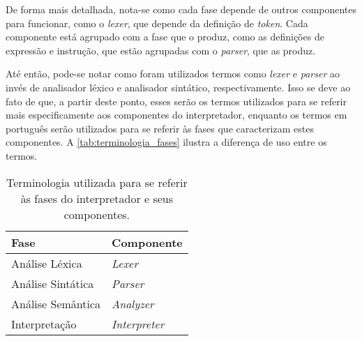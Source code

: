 De forma mais detalhada, nota-se como cada fase depende de outros componentes para funcionar, como o \textit{lexer}, que depende da definição de \textit{token}. Cada componente está agrupado com a fase que o produz, como as definições de expressão e instrução, que estão agrupadas com o \textit{parser}, que as produz.

Até então, pode-se notar como foram utilizados termos como \textit{lexer} e \textit{parser} ao invés de analisador léxico e analisador sintático, respectivamente. Isso se deve ao fato de que, a partir deste ponto, esses serão os termos utilizados para se referir mais especificamente aos componentes do interpretador, enquanto os termos em português serão utilizados para se referir às fases que caracterizam estes componentes. A \autoref{tab:terminologia_fases} ilustra a diferença de uso entre os termos.

\begin{table}[h]
	\centering
	\caption{Terminologia utilizada para se referir às fases do interpretador e seus componentes.}
	{
		\begin{tabular}{ll}
			\hline
			\textbf{Fase}          & \textbf{Componente} \\ \hline
			Análise Léxica      & \textit{Lexer}      \\
			Análise Sintática   & \textit{Parser}     \\
			Análise Semântica   & \textit{Analyzer}                   \\
			Interpretação       & \textit{Interpreter}                   \\ \hline
		\end{tabular}
	}
	\label{tab:terminologia_fases}
\end{table}
